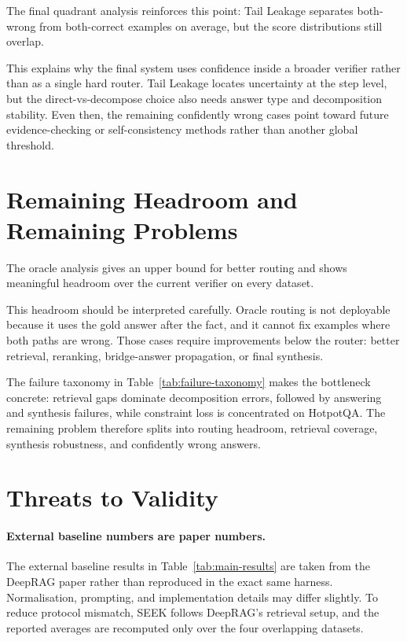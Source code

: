 \documentclass{nthu_thesis}
\begin{document}
\begin{thesiscjk}
The final quadrant analysis reinforces this point: Tail Leakage separates both-wrong from both-correct examples on average, but the score distributions still overlap.

This explains why the final system uses confidence inside a broader verifier rather than as a single hard router. Tail Leakage locates uncertainty at the step level, but the direct-vs-decompose choice also needs answer type and decomposition stability. Even then, the remaining confidently wrong cases point toward future evidence-checking or self-consistency methods rather than another global threshold.

\section{Remaining Headroom and Remaining Problems}
\label{sec:remaining-headroom}

The oracle analysis gives an upper bound for better routing and shows meaningful headroom over the current verifier on every dataset.

This headroom should be interpreted carefully. Oracle routing is not deployable because it uses the gold answer after the fact, and it cannot fix examples where both paths are wrong. Those cases require improvements below the router: better retrieval, reranking, bridge-answer propagation, or final synthesis.

The failure taxonomy in Table~\ref{tab:failure-taxonomy} makes the bottleneck concrete: retrieval gaps dominate decomposition errors, followed by answering and synthesis failures, while constraint loss is concentrated on HotpotQA. The remaining problem therefore splits into routing headroom, retrieval coverage, synthesis robustness, and confidently wrong answers.

\section{Threats to Validity}
\label{sec:threats}

\paragraph{External baseline numbers are paper numbers.} The external baseline results in Table~\ref{tab:main-results} are taken from the DeepRAG paper rather than reproduced in the exact same harness. Normalisation, prompting, and implementation details may differ slightly. To reduce protocol mismatch, SEEK follows DeepRAG's retrieval setup, and the reported averages are recomputed only over the four overlapping datasets.


\end{thesiscjk}
\end{document}

